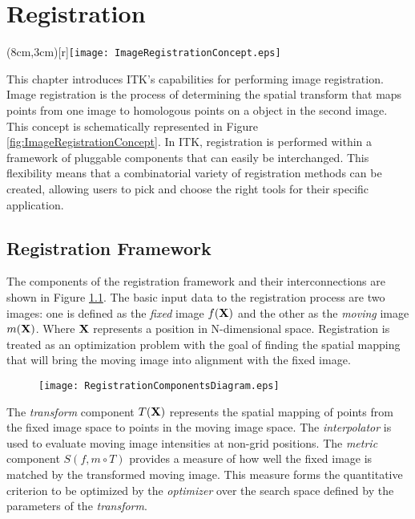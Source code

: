 
\chapter{Registration}

\parpic(8cm,3cm)[r]{\texttt{[image: ImageRegistrationConcept.eps]}}
  
This chapter introduces ITK's capabilities for performing image
registration. Image registration is the process of determining the spatial
transform that maps points from one image to homologous points on a object in
the second image. This concept is schematically represented in Figure
\ref{fig:ImageRegistrationConcept}. In ITK, registration is performed within
a framework of pluggable components that can easily be interchanged.  This
flexibility means that a combinatorial variety of registration methods can be
created, allowing users to pick and choose the right tools for their specific
application.


\section{Registration Framework}
The components of the registration framework and their interconnections are
shown in Figure \ref{fig:RegistrationComponents}. The basic input data to the
registration process are two images: one is defined as the \emph{fixed} image
$f(\bf{X})$ and the other as the \emph{moving} image $m(\bf{X})$. Where
$\bf{X}$ represents a position in N-dimensional space. Registration is treated
as an optimization problem with the goal of finding the spatial mapping that
will bring the moving image into alignment with the fixed image.

\begin{figure}
\center
\texttt{[image: RegistrationComponentsDiagram.eps]}
\label{fig:RegistrationComponents}
\end{figure}

The \emph{transform} component $T(\bf{X})$ represents the spatial mapping of
points from the fixed image space to points in the moving image space. The
\emph{interpolator} is used to evaluate moving image intensities at non-grid
positions. The \emph{metric} component $S(f,m \circ T)$ provides a measure of
how well the fixed image is matched by the transformed moving image. This
measure forms the quantitative criterion to be optimized by the
\emph{optimizer} over the search space defined by the parameters of the
\emph{transform}.

